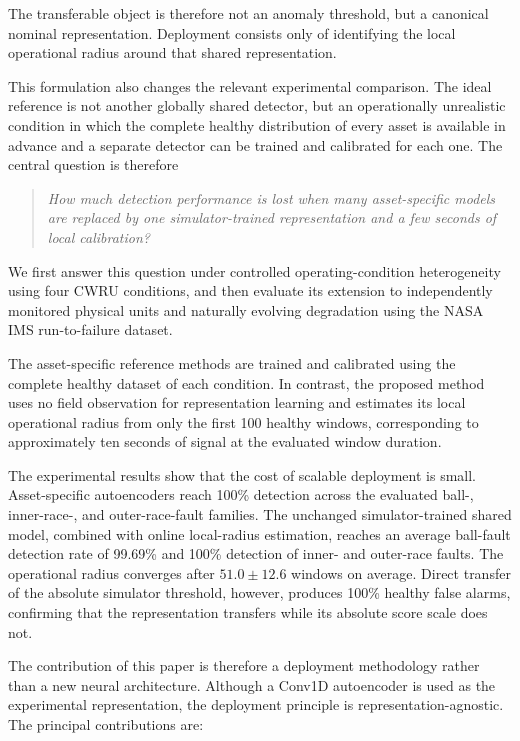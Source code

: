 \documentclass[11pt,a4paper]{article}
\begin{document}
The transferable object is therefore not an anomaly threshold, but a canonical nominal
representation. Deployment consists only of identifying the local operational radius around that
shared representation.

This formulation also changes the relevant experimental comparison. The ideal reference is not
another globally shared detector, but an operationally unrealistic condition in which the
complete healthy distribution of every asset is available in advance and a separate detector can
be trained and calibrated for each one. The central question is therefore

\begin{quote}
\emph{How much detection performance is lost when many asset-specific models are replaced by one
simulator-trained representation and a few seconds of local calibration?}
\end{quote}

We first answer this question under controlled operating-condition
heterogeneity using four CWRU \cite{smith2015} conditions, and then evaluate its extension
to independently monitored physical units and naturally evolving
degradation using the NASA IMS run-to-failure dataset.

The asset-specific reference methods are trained and calibrated using the complete healthy dataset of each condition. In contrast, the proposed method
uses no field observation for representation learning and estimates its local operational radius
from only the first 100 healthy windows, corresponding to approximately ten seconds of signal at
the evaluated window duration.

The experimental results show that the cost of scalable deployment is small. Asset-specific
autoencoders reach 100\% detection across the evaluated ball-, inner-race-, and outer-race-fault
families. The unchanged simulator-trained shared model, combined with online local-radius
estimation, reaches an average ball-fault detection rate of 99.69\% and 100\% detection of
inner- and outer-race faults. The operational radius converges after
$51.0\pm12.6$ windows on average. Direct transfer of the absolute simulator threshold, however,
produces 100\% healthy false alarms, confirming that the representation transfers while its
absolute score scale does not.

The contribution of this paper is therefore a deployment methodology rather than a new neural
architecture. Although a Conv1D autoencoder is used as the experimental representation, the
deployment principle is representation-agnostic. The principal contributions are:
\end{document}
